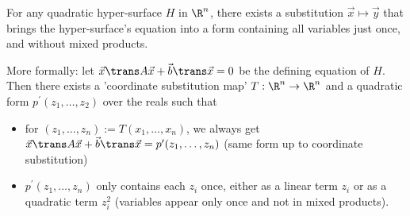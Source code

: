 \begin{theorem}
    For any quadratic hyper-surface $H$ in $\R^n$, there exists a substitution $\vec{x}\mapsto\vec{y}$ that brings
    the hyper-surface's equation into a form containing all variables just once, and without mixed products.

    More formally: let $\vec{x}\trans A \vec{x} + \vec{b}\trans\vec{x} = 0$ be the defining equation of $H$. Then there
    exists a 'coordinate substitution map' $T: \R^n \to \R^n$ and a quadratic form $p^\prime(z_1,\dots,z_2)$ over the reals such that
    \begin{itemize}
        \item for $(z_1,\dots,z_n) := T(x_1,\dots,x_n)$, we always get $\vec{x}\trans A \vec{x} + \vec{b}\trans\vec{x}=p^\prime(z_1,\dots,z_n)$ 
            (same form up to coordinate substitution)
        \item $p^\prime(z_1,\dots,z_n)$ only contains each $z_i$ once, either as a linear term $z_i$ or as a quadratic term $z_i^2$
            (variables appear only once and not in mixed products).
    \end{itemize}
\end{theorem}

